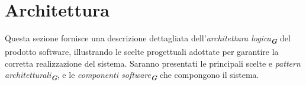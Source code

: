 
\section{Architettura}
\label{sec:architettura}

Questa sezione fornisce una descrizione dettagliata dell'\emph{architettura logica}\textsubscript{\textbf{\textit{G}}} del prodotto software, illustrando le scelte progettuali adottate per garantire la corretta realizzazione del sistema. Saranno presentati le principali scelte e \emph{pattern architetturali}\textsubscript{\textbf{\textit{G}}}, e le \emph{componenti software}\textsubscript{\textbf{\textit{G}}} che compongono il sistema.

